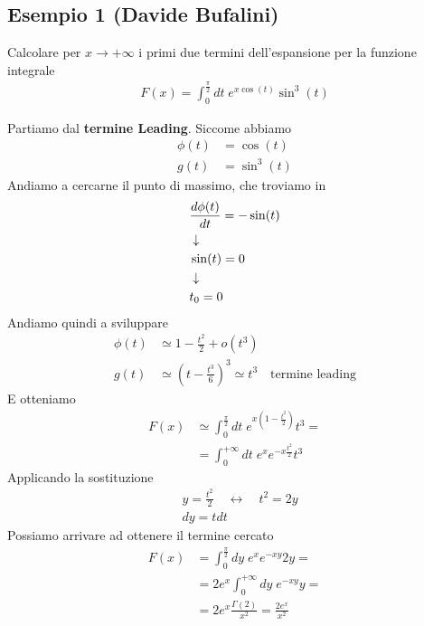 \subsection{Esempio 1 (Davide Bufalini)}

Calcolare per $x\rightarrow +\infty$ i primi due termini dell'espansione per la funzione integrale
\begin{align}
	F(x) = \int_{0}^{\frac{\pi}{2}} dt \; e^{x\cos(t)}\sin^3(t)
\end{align}

Partiamo dal \textbf{termine Leading}. Siccome abbiamo
\begin{align}
	\phi(t) &= \cos(t) \\
	g(t) &= \sin^3(t)
\end{align}
Andiamo a cercarne il punto di massimo, che troviamo in
\begin{align}
	&\frac{d \phi(t)}{dt} = -\sin(t) \\ &\downarrow \nonumber \\
	&\sin(t) = 0 \nonumber \\ &\downarrow \nonumber \\
	&t_0=0
\end{align}
Andiamo quindi a sviluppare
\begin{align}
	\phi(t) &\simeq 1- \frac{t^2}{2} + o(t^3)  \\
	g(t) &\simeq \left( t - \frac{t^3}{6} \right)^3 \simeq t^3 \quad \text{termine leading}
\end{align}
E otteniamo
\begin{align}
	F(x) &\simeq \int_{0}^{\frac{\pi}{2}} dt \; e^{x\left(1- \frac{t^2}{2}\right)}t^3 = \nonumber\\
	&= \int_{0}^{+\infty} dt \; e^x e^{-x\frac{t^2}{2}}t^3
\end{align}
Applicando la sostituzione
\begin{align}
	&y= \frac{t^2}{2} \quad \leftrightarrow \quad t^2 = 2y \\
	&dy = tdt
\end{align}
Possiamo arrivare ad ottenere il termine cercato
\begin{align}
	F(x) &= \int_{0}^{\frac{\pi}{2}} dy \; e^x e^{-xy}2y = \nonumber\\
		 &= 2e^x\int_{0}^{+\infty} dy \;e^{-xy}y = \nonumber\\
		 &= 2e^x \frac{\Gamma(2)}{x^2} = \frac{2e^x}{x^2}
\end{align}

